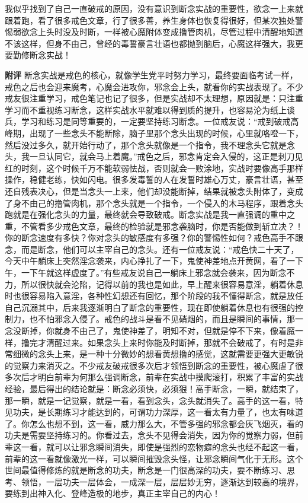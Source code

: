 \begin{case}
    我似乎找到了自己一直破戒的原因，没有意识到断念实战的重要性，欲念一上来就跟着跑，看了很多戒色文章，行了很多善，养生身体也恢复得很好，但某次独处警惕弱欲念上头时没及时断，一样被心魔附体变成撸管肉机，尽管过程中清醒地知道不该这样，但身不由己，曾经的毒誓豪言壮语也都抛到脑后，心魔这样强大，我更要勤修断念实战！

    \textbf{附评} 断念实战是戒色的核心，就像学生党平时努力学习，最终要面临考试一样，戒色之后也会迎来魔考，心魔会进攻你，邪念会上头，就看你的实战表现了。不少戒友很注重学习，戒色笔记也记了很多，但是实战却不太理想，原因就是：只注重学习而不重视练习断念，这样实战水平就难以得到质的提升，也容易沦为纸上谈兵，学习和练习是同等重要的，一定要坚持练习断念。一位戒友说：“戒到破戒高峰期，出现了一些念头不能断除，脑子里那个念头出现的时候，心里就咯噔一下，然后没过多久，就开始行动了，那个念头就像是一个指令，我不理念头它就是念头，我一旦认同它，就会马上着魔。”戒色之后，邪念肯定会入侵的，这正是刺刀见红的时刻，这个时候千万不能软弱怯战，否则就会一败涂地，实战时要像高手那样操作，稳健老练，快如闪电。很多发毒誓的人在发誓时雄心万丈，豪言壮语，甚至还自残表决心，但是当念头一上来，他们却没能断掉，结果就被念头附体了，变成了身不由己的撸管肉机，那个念头就是一个指令，一个侵入的木马程序，跟着念头跑就是在强化念头的力量，最终就会导致破戒。断念实战是我一直强调的重中之重，不管看多少戒色文章，最终的检验就是邪念袭脑时，你是否能做到斩立决？！你的断念速度有多快？你对念头的敏感度有多强？你的警惕性如何？戒色高手不跟念，而是断念，他们可以主宰自己的念头。还有一位戒友说：“戒色快二十天了，今天中午躺床上突然淫念袭来，内心挣扎了一下，鬼使神差地点开黄网，看了一下午，一下午就这样虚度了。”有些戒友说自己一躺床上邪念就会袭来，因为断念不力，所以很快就会沦陷，记得以前的我也是如此，早上醒来很容易意淫，躺着休息时也很容易陷入意淫，各种性幻想还有回忆，那个阶段的我不懂得断念，就是放任自己沉溺其中，后来我逐渐明白了断念的重要性，现在即使躺着休息也有很强的控制力，也不怕邪念入侵了。戒色的战斗是看不见硝烟的，而且是瞬间的事情，那一念没断掉，你就身不由己了，鬼使神差了，明知不对，但就是停不下来，像着魔一样，撸完才清醒过来。如果念头上来时你能及时断掉，那就不会破戒了，有时是非常细微的念头上来，是一种十分微妙的想看黄想撸的感觉，这就需要更强大更敏锐的觉察力来消灭之。不少戒友破戒很多次后才领悟到断念的重要性，被心魔虐了很多次后才明白前辈为何那么强调断念，前辈在实战中摸爬滚打，积累了丰富的实战经验，最后得出的结论就是：断念必须快，必须狠！高手断念，一瞬，就结束了，那一瞬，就是一记觉察，就是一看，看到念头，念头就消失了。高手的这一看，特见功夫，是长期练习才能达到的，可谓功力深厚，这一看太有力量了，也太有味道了。你怎么也想不到，这一看，威力那么大，不管多强的邪念都会灰飞烟灭，看的功夫是需要坚持练习的。你看过去，念头不见得会消失，因为你的觉察力弱，但前辈这一看，就可以让邪念瞬间消失，即使是强烈的恋物癖的念头也经不起这一看，前辈的这一看就像激光一样，可以瞬间摧毁念头怪，让邪念瞬间气化于无形。这个世间最值得修炼的就是断念的功夫，断念是一门很高深的功夫，要不断练习、思考、领悟，一层功夫一层体会，一成深一层，层层妙无穷，逐渐达到较高的境界，要练到出神入化、登峰造极的地步，真正主宰自己的内心！
\end{case}

